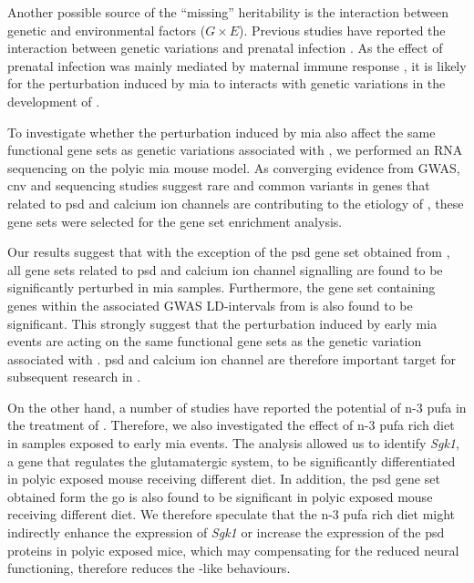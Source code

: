 \documentclass[12pt]{scrbook}
\newcommand*{\glng}{\glsentrylong}
\begin{document}
	Another possible source of the ``missing'' heritability is the interaction between genetic and environmental factors ($G\times E$). 
	Previous studies have reported the interaction between genetic variations and prenatal infection \citep{Tienari2004,Clarke2009}. 
	As the effect of prenatal infection was mainly mediated by maternal immune response \citep{Brown2010}, it is likely for the perturbation induced by \gls{mia} to interacts with genetic variations in the development of \glng{scz}.
	
	To investigate whether the perturbation induced by \gls{mia} also affect the same functional gene sets as genetic variations associated with \glng{scz}, we performed an RNA sequencing on the \gls{polyic} \gls{mia} mouse model. 
	As converging evidence from \gls{GWAS}, \gls{cnv} and sequencing studies suggest rare and common variants in genes that related to \gls{psd} \citep{Purcell2014,Consortium2015a} and calcium ion channels \citep{Purcell2014,Ripke2014,Szatkiewicz2014} are contributing to the etiology of \glng{scz}, these gene sets were selected for the gene set enrichment analysis. 
	
	Our results suggest that with the exception of the \gls{psd} gene set obtained from \citet{Purcell2014}, all gene sets related to \gls{psd} and calcium ion channel signalling are found to be significantly perturbed in \gls{mia} samples. 
	Furthermore, the gene set containing genes within the associated \gls{GWAS} LD-intervals from \citet{Purcell2014} is also found to be significant.
	This strongly suggest that the perturbation induced by early \gls{mia} events are acting on the same functional gene sets as the genetic variation associated with \glng{scz}.
	\gls{psd} and calcium ion channel are therefore important target for subsequent research in \glng{scz}.
	
	On the other hand, a number of studies have reported the potential of n-3 \gls{pufa} in the treatment of \glng{scz} \citep{Li2015,Trebble2003}.
	Therefore, we also investigated the effect of n-3 \gls{pufa} rich diet in samples exposed to early \gls{mia} events.
	The analysis allowed us to identify \textit{Sgk1}, a gene that regulates the glutamatergic system, to be significantly differentiated in \gls{polyic} exposed mouse receiving different diet. 
	In addition, the \gls{psd} gene set obtained form the \gls{go} is also found to be significant in \gls{polyic} exposed mouse receiving different diet. 
	We therefore speculate that the n-3 \gls{pufa} rich diet might indirectly enhance the expression of \textit{Sgk1} or increase the expression of the \gls{psd} proteins in \gls{polyic} exposed mice, which may compensating for the reduced neural functioning, therefore reduces the \glng{scz}-like behaviours.
	
\end{document}
